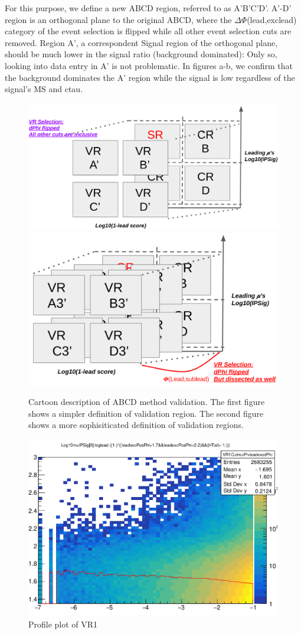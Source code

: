 For this purpose, we define a new ABCD region, referred to as A'B'C'D'.
A'-D' region is an orthogonal plane to the original ABCD, where the $\Delta\Phi$(lead,exclead) category of the event selection is flipped while all other event selection cuts are removed.
Region A', a correspondent Signal region of the orthogonal plane, should be much lower in the signal ratio (background dominated): Only so, looking into data entry in A' is not problematic.
In figures a-b, we confirm that the background dominates the A' region while the signal is low regardless of the signal's MS and ctau.

\begin{figure}[h!]
  \caption{Cartoon description of ABCD method validation. The first figure shows a simpler definition of validation region. The second figure shows a more sophisiticated definition of validation regions. }
  \label{fig:valcar}
  \centering
  \includegraphics[width=0.85\linewidth]{figs/SimpleVR.png}
  \includegraphics[width=0.85\linewidth]{figs/SophiVR.png}

\end{figure}


\begin{figure}[h!]
  \caption{Profile plot of VR1}
  \label{fig:valcar2}
  \centering
  \includegraphics[width=0.65\linewidth]{figs/VR1.png}

\end{figure}

